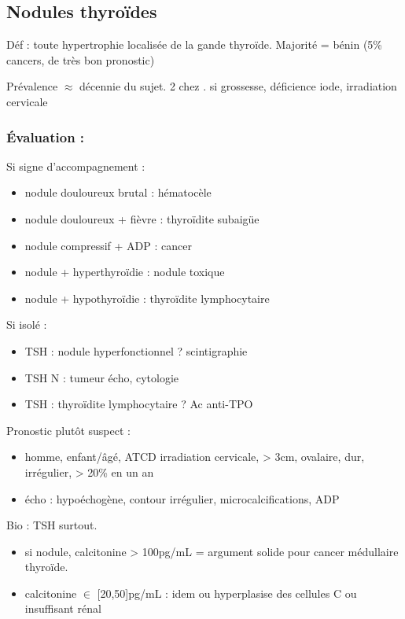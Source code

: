\documentclass[11pt]{article}
\begin{document}
\subsection{Nodules thyroïdes}
\label{sec:orga00b7cc}
Déf : toute hypertrophie localisée de la gande thyroïde. Majorité = bénin (5\%
cancers, de très bon pronostic)

Prévalence \(\approx\) décennie du sujet. \texttimes{} 2 chez \female. \inc si grossesse,
déficience iode, irradiation cervicale

\subsubsection{Évaluation :}
\label{sec:orgadcbd7a}
Si signe d'accompagnement :
\begin{itemize}
\item nodule douloureux brutal : hématocèle
\item nodule douloureux + fièvre : thyroïdite subaigüe
\item nodule compressif + ADP : cancer
\item nodule + hyperthyroïdie : nodule toxique
\item nodule + hypothyroïdie : thyroïdite lymphocytaire
\end{itemize}
Si isolé : 
\begin{itemize}
\item TSH \dec : nodule hyperfonctionnel ? \thus scintigraphie
\item TSH N : tumeur \thus écho, cytologie
\item TSH \inc : thyroïdite lymphocytaire ? \thus Ac anti-TPO
\end{itemize}

Pronostic plutôt suspect : 
\begin{itemize}
\item homme, enfant/âgé, ATCD irradiation cervicale, > 3cm, ovalaire, dur, irrégulier, > 20\% en un an
\item écho : hypoéchogène, contour irrégulier, microcalcifications, ADP
\end{itemize}

Bio : TSH surtout. 
\begin{itemize}
\item si nodule, calcitonine > 100pg/mL = argument solide pour cancer médullaire thyroïde.
\item calcitonine \(\in\) [20,50]pg/mL : idem ou hyperplasise des cellules C ou insuffisant rénal
\end{itemize}
\end{document}
